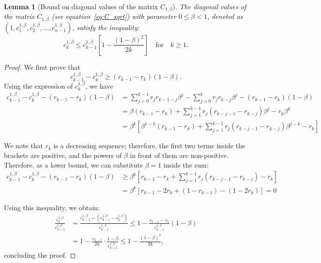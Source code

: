 \documentclass{article} %
\newtheorem{lemma}{Lemma}
\begin{document}
\begin{lemma}
[Bound on diagonal values of the matrix $C_{1, \beta}$]
\label{lem:c_k_beta_mult_bound}
The diagonal values of the matrix $C_{1, \beta}$ (see equation~\eqref{eq:C_sqrt}) with parameter $0 \le \beta < 1$, denoted as $(1, c_1^{1, \beta}, c_2^{1, \beta}, \dots, c_{n - 1}^{1, \beta})$, satisfy the inequality:
%
\begin{equation}
    c_k^{1, \beta} \le c_{k - 1}^{1, \beta} \left[1 - \frac{(1 - \beta)^2}{2k}\right] \quad \text{for} \quad k \ge 1.
\end{equation}
\end{lemma}

\begin{proof}
We first prove that 
\begin{equation}
    c_{k - 1}^{1, \beta} - c_{k}^{1, \beta} \ge (r_{k - 1} - r_{k}) (1 - \beta).
\end{equation} Using the expression of $c_k^{1,\beta}$, we have 
%
\begin{equation*}
\begin{aligned}
    c_{k - 1}^{1, \beta} - c_{k}^{1, \beta} - (r_{k - 1} - r_{k}) (1 - \beta) &= \sum\limits_{j = 0}^{k - 1} r_j r_{k - 1 - j} \beta^{j} - \sum\limits_{j = 0}^{k} r_j r_{k - j} \beta^{j} - (r_{k - 1} - r_{k}) (1 - \beta)\\
    &= \beta(r_{k - 1} - r_{k}) + \sum\limits_{j = 1}^{k - 1} r_j (r_{k - j - 1} - r_{k - j}) \beta^j - r_k \beta^k\\
    &= \beta^{k} \left[\beta^{1 - k}(r_{k - 1} - r_{k}) + \sum\limits_{j = 1}^{k - 1} r_j (r_{k - j - 1} - r_{k - j}) \beta^{j - k} - r_k\right]
\end{aligned}
\end{equation*}

We note that $r_k$ is a decreasing sequence; therefore, the first two terms inside the brackets are positive, and the powers of $\beta$ in front of them are non-positive. Therefore, as a lower bound, we can substitute $\beta = 1$ inside the sum:
%
\begin{equation}
\begin{aligned}
    c_{k - 1}^{1, \beta} - c_{k}^{1, \beta} - (r_{k - 1} - r_{k}) (1 - \beta) &\ge \beta^{k} \left[r_{k - 1} - r_{k} + \sum\limits_{j = 1}^{k - 1} r_j (r_{k - j - 1} - r_{k - j}) - r_k\right]\\
    &= \beta^k [r_{k - 1} - 2r_k + (1 - r_{k - 1}) - (1 - 2r_{k})]
    = 0
\end{aligned}
\end{equation}

Using this inequality, we obtain:
\begin{equation}
\begin{aligned}
    \frac{c_{k}^{1, \beta}}{c_{k - 1}^{1, \beta}} &= \frac{c_{k - 1}^{1, \beta} - (c_{k - 1}^{1, \beta} - c_{k}^{1, \beta})}{c_{k - 1}^{1, \beta}} \le 1 - \frac{r_{k - 1} - r_k}{c^{1, \beta}_{k - 1}} (1 - \beta) \\
    &= 1 - \frac{r_{k - 1}}{2k} \cdot \frac{1 - \beta}{c^{1, \beta}_{k - 1}} \le 1 - \frac{(1 - \beta)^2}{2k},    
\end{aligned}
\end{equation}
concluding the proof.
\end{proof}
\end{document}
